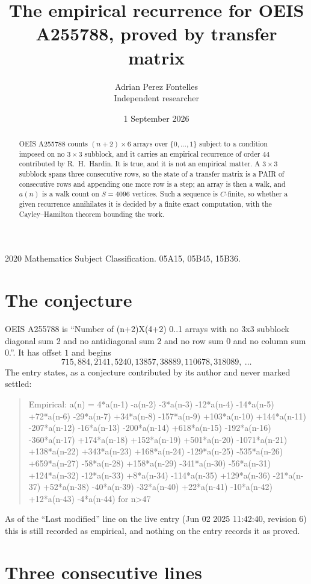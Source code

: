 \documentclass[11pt,a4paper]{article}
\title{The empirical recurrence for OEIS A255788, proved by transfer matrix}
\author{Adrian Perez Fontelles\\ \small Independent researcher}
\date{1 September 2026}
\theoremstyle{plain}
\theoremstyle{definition}
\begin{document}
\maketitle

\begin{abstract}
OEIS A255788 counts $(n+2)\times6$ arrays over $\{0,\dots,1\}$ subject to a condition imposed on
no $3\times3$ subblock, and it carries an empirical recurrence of order $44$
contributed by R.~H.~Hardin. It is true, and it is not an empirical matter. A $3\times3$
subblock spans three consecutive rows, so the state of a transfer matrix is a PAIR of
consecutive rows and appending one more row is a step; an array is then a walk, and
$a(n)$ is a walk count on $S=4096$ vertices. Such a sequence is $C$-finite, so whether a given
recurrence annihilates it is decided by a finite exact computation, with the Cayley--Hamilton
theorem bounding the work.
\end{abstract}

\noindent\small 2020 Mathematics Subject Classification. 05A15, 05B45, 15B36.\normalsize

\section{The conjecture}

OEIS A255788 is ``Number of (n+2)X(4+2) 0..1 arrays with no 3x3 subblock diagonal sum 2 and no antidiagonal sum 2 and no row sum 0 and no column sum 0.''. It has offset $1$ and begins
\[
715, 884, 2141, 5240, 13857, 38889, 110678, 318089,\ \dots
\]
The entry states, as a conjecture contributed by its author and never marked settled:
\begin{quote}
Empirical: a(n) = 4*a(n-1) -a(n-2) -3*a(n-3) -12*a(n-4) -14*a(n-5) +72*a(n-6) -29*a(n-7) +34*a(n-8) -157*a(n-9) +103*a(n-10) +144*a(n-11) -207*a(n-12) -16*a(n-13) -200*a(n-14) +618*a(n-15) -192*a(n-16) -360*a(n-17) +174*a(n-18) +152*a(n-19) +501*a(n-20) -1071*a(n-21) +138*a(n-22) +343*a(n-23) +168*a(n-24) -129*a(n-25) -535*a(n-26) +659*a(n-27) -58*a(n-28) +158*a(n-29) -341*a(n-30) -56*a(n-31) +124*a(n-32) -12*a(n-33) +8*a(n-34) -114*a(n-35) +129*a(n-36) -21*a(n-37) +52*a(n-38) -40*a(n-39) -32*a(n-40) +22*a(n-41) -10*a(n-42) +12*a(n-43) -4*a(n-44) for n>47
\end{quote}
As of the ``Last modified'' line on the live entry (Jun 02 2025 11:42:40, revision 6) this is still
recorded as empirical, and nothing on the entry records it as proved.

\section{Three consecutive lines}
\end{document}
